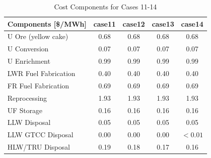 \begin{table}[htbp]
\begin{center}
\caption{Cost Components for Cases 11-14}
\label{ses_table13_1}
\begin{tabular}{|l|c|c|c|c|}
\hline
\textbf{Components [\$/MWh]} & \textbf{case11} & \textbf{case12} & \textbf{case13} & \textbf{case14} \\
\hline
U Ore (yellow cake)          & 0.68            & 0.68            & 0.68            & 0.68 \\
U Conversion                 & 0.07            & 0.07            & 0.07            & 0.07 \\
U Enrichment                 & 0.99            & 0.99            & 0.99            & 0.99 \\
LWR Fuel Fabrication         & 0.40            & 0.40            & 0.40            & 0.40 \\
FR Fuel Fabrication          & 0.69            & 0.69            & 0.69            & 0.69 \\
Reprocessing                 & 1.93            & 1.93            & 1.93            & 1.93 \\
UF Storage                   & 0.16            & 0.16            & 0.16            & 0.16 \\
LLW Disposal                 & 0.05            & 0.05            & 0.05            & 0.05 \\
LLW GTCC Disposal            & 0.00            & 0.00            & 0.00            & $<0.01$ \\
HLW/TRU Disposal             & 0.19            & 0.18            & 0.17            & 0.16 \\
\hline
\end{tabular}
\end{center}
\end{table}


